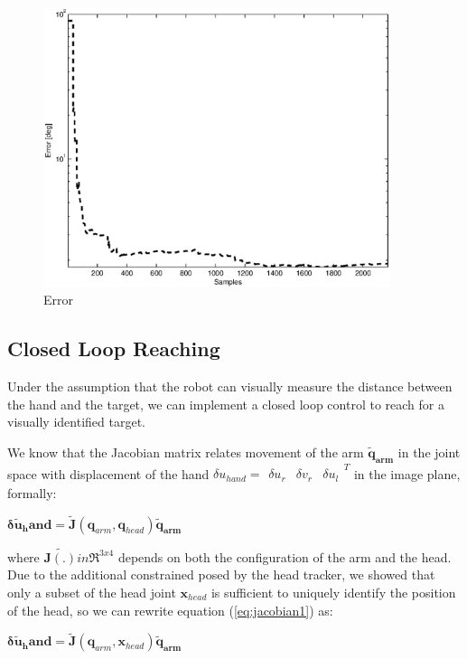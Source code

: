 \begin{figure}[tbp]
\centerline{
\includegraphics[width=4.0in, angle=0 ]{./Figure/reachingError1.eps}
} \caption{Error} 
\label{fig:reaching-error}
\end{figure}

\subsection{Closed Loop Reaching}
%
Under the assumption that the robot can visually measure the distance
between the hand and the target, we can implement a closed loop 
control to reach for a visually identified target.

We know that the Jacobian matrix relates movement of the arm 
$\mathbf{\tilde{q}_{arm}}$ in the 
joint space with displacement of the hand 
$\delta u_{hand}=\begin{array}{ccc} \delta u_r & \delta v_r & \delta u_l\end{array}^T$ 
in the image plane, formally:
%
\begin{center} 
\begin{math}
\label{eq:jacobian1}
  \mathbf{\delta \tilde{u}_hand}=
  \tilde{\mathbf J}\left(\mathbf q_{arm}, \mathbf q_{head}\right)
  \mathbf{\tilde{q}_{arm}}
\end{math}
\end{center}
%
where $\tilde{\mathbf J(.)} in \Re^{3x4}$ depends on 
both the configuration of the arm and the head. Due to the 
additional constrained posed by the head tracker, we showed
that only a subset of the head joint $\mathbf x_{head}$ is 
sufficient to uniquely identify the position of the head, so we 
can rewrite equation (\ref{eq:jacobian1}) as:
%
\begin{center} 
\begin{math}
\label{eq:jacobian2}
  \mathbf{\delta \tilde{u}_hand}=
  \tilde{\mathbf J}\left(\mathbf q_{arm}, \mathbf x_{head}\right)
  \mathbf{\tilde{q}_{arm}}
\end{math}
\end{center}
%

